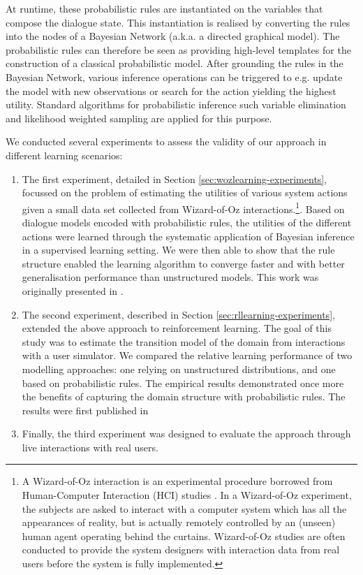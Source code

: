 At runtime, these probabilistic rules are instantiated on the variables that compose the dialogue state.  This instantiation is realised by converting the rules into the nodes of a Bayesian Network (a.k.a. a directed graphical model).  The probabilistic rules can therefore be seen as providing high-level templates for the construction of a classical probabilistic model.  After grounding the rules in the Bayesian Network, various inference operations can be triggered to e.g. update the model with new observations or search for the action yielding the highest utility.  Standard algorithms for probabilistic inference such variable elimination \citep{ZhangP96} and likelihood weighted sampling \citep{FungC89} are applied for this purpose.

We conducted several experiments to assess the validity of our approach in different learning scenarios: \begin{enumerate}
\item The first experiment, detailed in Section \ref{sec:wozlearning-experiments}, focussed on the problem of estimating the utilities of various system actions given a small data set collected from Wizard-of-Oz interactions.\footnote{A Wizard-of-Oz interaction is an experimental procedure borrowed from Human-Computer Interaction (HCI) studies \citep{woz93}. In a Wizard-of-Oz experiment, the subjects are asked to interact with a computer system which has all the appearances of reality, but is actually remotely controlled by an (unseen) human agent operating behind the curtains.  Wizard-of-Oz studies are often conducted to provide the system designers with interaction data from real users before the system is fully implemented.}.  Based on dialogue models encoded with probabilistic rules, the utilities of the different actions were learned through the systematic application of Bayesian inference in a supervised learning setting.  We were then able to show that the rule structure enabled the learning algorithm to converge faster and with better generalisation performance than unstructured models. This work was originally presented in \citep{rulebasedmodels-sigdial2012}.
\item The second experiment, described in Section \ref{sec:rllearning-experiments}, extended the above approach to reinforcement learning. The goal of this study was to estimate the transition model of the domain from interactions with a user simulator. We compared the relative learning performance of two modelling approaches: one relying on unstructured distributions, and one based on probabilistic rules. The empirical results demonstrated once more the benefits of capturing the domain structure with probabilistic rules. The results were first published in  
\item Finally, the third experiment was designed to evaluate the approach through live interactions with real users.   
\end{enumerate}

